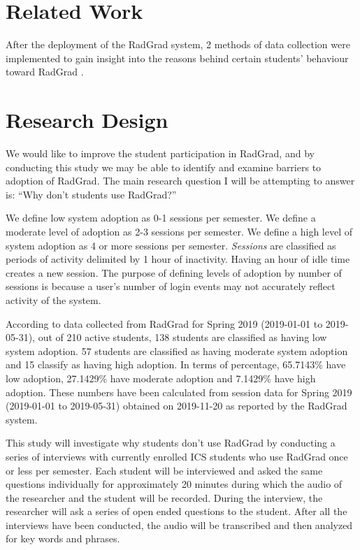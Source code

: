 \documentclass[english]{proposalnsf}
\begin{document}
\section{Related Work}
\label{related-work}

After the deployment of the RadGrad system, 2 methods of data collection were implemented to gain insight into the reasons behind certain students' behaviour toward RadGrad \cite{Johnson_RadGrad_2020}.  

\section{Research Design}
\label{research-design}

We would like to improve the student participation in RadGrad, and by conducting this study we may be able to identify and examine barriers to adoption of RadGrad. The main research question I will be attempting to answer is: ``Why don't students use RadGrad?''

We define low system adoption as 0-1 sessions per semester. We define a moderate level of adoption as 2-3 sessions per semester.  We define a high level of system adoption as 4 or more sessions per semester. 
{\em Sessions} are classified as periods of activity delimited by 1 hour of inactivity. Having an hour of idle time creates a new session. The purpose of defining levels of adoption by number of sessions is because a user's number of login events may not accurately reflect activity of the system. 

According to data collected from RadGrad for Spring 2019 (2019-01-01 to 2019-05-31), out of 210 active students, 138 students are classified as having low system adoption. 57 students are classified as having moderate system adoption and 15 classify as having high adoption. In terms of percentage, 65.7143{\%} have low adoption, 27.1429{\%} have moderate adoption and 7.1429{\%} have high adoption. These numbers have been calculated from session data for Spring 2019 (2019-01-01 to 2019-05-31) obtained on 2019-11-20 as reported by the RadGrad system. 

This study will investigate why students don't use RadGrad by conducting a series of interviews with currently enrolled ICS students who use RadGrad once or less per semester. Each student will be interviewed and asked the same questions individually for approximately 20 minutes during which the audio of the researcher and the student will be recorded. During the interview, the researcher will ask a series of open ended questions to the student. After all the interviews have been conducted, the audio will be transcribed and then analyzed for key words and phrases.
\end{document}
